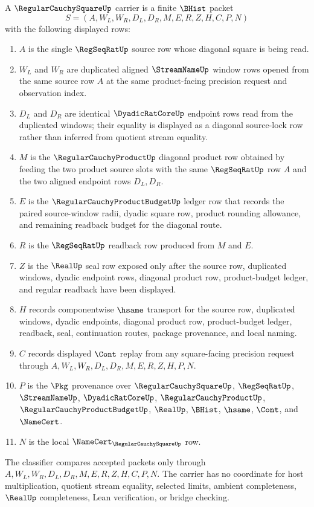 \begin{definition}
\label{def:regular-cauchy-square-carrier}
A $\RegularCauchySquareUp$ carrier is a finite $\BHist$ packet
$$
S=(A,W_L,W_R,D_L,D_R,M,E,R,Z,H,C,P,N)
$$
with the following displayed rows:
\begin{enumerate}
\item $A$ is the single $\RegSeqRatUp$ source row whose diagonal square is being read.
\item $W_L$ and $W_R$ are duplicated aligned $\StreamNameUp$ window rows opened from the same source row $A$ at the same product-facing precision request and observation index.
\item $D_L$ and $D_R$ are identical $\DyadicRatCoreUp$ endpoint rows read from the duplicated windows; their equality is displayed as a diagonal source-lock row rather than inferred from quotient stream equality.
\item $M$ is the $\RegularCauchyProductUp$ diagonal product row obtained by feeding the two product source slots with the same $\RegSeqRatUp$ row $A$ and the two aligned endpoint rows $D_L,D_R$.
\item $E$ is the $\RegularCauchyProductBudgetUp$ ledger row that records the paired source-window radii, dyadic square row, product rounding allowance, and remaining readback budget for the diagonal route.
\item $R$ is the $\RegSeqRatUp$ readback row produced from $M$ and $E$.
\item $Z$ is the $\RealUp$ seal row exposed only after the source row, duplicated windows, dyadic endpoint rows, diagonal product row, product-budget ledger, and regular readback have been displayed.
\item $H$ records componentwise $\hsame$ transport for the source row, duplicated windows, dyadic endpoints, diagonal product row, product-budget ledger, readback, seal, continuation routes, package provenance, and local naming.
\item $C$ records displayed $\Cont$ replay from any square-facing precision request through $A,W_L,W_R,D_L,D_R,M,E,R,Z,H,P,N$.
\item $P$ is the $\Pkg$ provenance over $\RegularCauchySquareUp$, $\RegSeqRatUp$, $\StreamNameUp$, $\DyadicRatCoreUp$, $\RegularCauchyProductUp$, $\RegularCauchyProductBudgetUp$, $\RealUp$, $\BHist$, $\hsame$, $\Cont$, and $\NameCert$.
\item $N$ is the local $\NameCert_{\RegularCauchySquareUp}$ row.
\end{enumerate}
The classifier compares accepted packets only through $A,W_L,W_R,D_L,D_R,M,E,R,Z,H,C,P,N$. The carrier has no coordinate for host multiplication, quotient stream equality, selected limits, ambient completeness, $\RealUp$ completeness, Lean verification, or bridge checking.
\end{definition}

